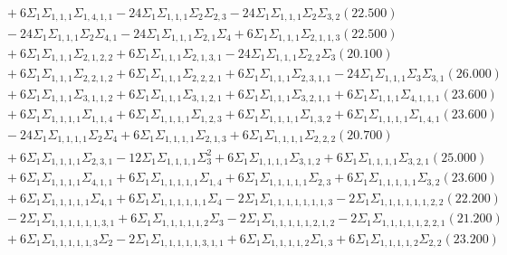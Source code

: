 \documentclass[12pt]{article}
\begin{document}
\begin{landscape}
\begin{align*}
		&\quad\quad +6\Sigma_{1}\Sigma_{1,1,1}\Sigma_{1,4,1,1}-24\Sigma_{1}\Sigma_{1,1,1}\Sigma_{2}\Sigma_{2,3}-24\Sigma_{1}\Sigma_{1,1,1}\Sigma_{2}\Sigma_{3,2}(22.500) \\ 
		&\quad\quad -24\Sigma_{1}\Sigma_{1,1,1}\Sigma_{2}\Sigma_{4,1}-24\Sigma_{1}\Sigma_{1,1,1}\Sigma_{2,1}\Sigma_{4}+6\Sigma_{1}\Sigma_{1,1,1}\Sigma_{2,1,1,3}(22.500) \\ 
		&\quad\quad +6\Sigma_{1}\Sigma_{1,1,1}\Sigma_{2,1,2,2}+6\Sigma_{1}\Sigma_{1,1,1}\Sigma_{2,1,3,1}-24\Sigma_{1}\Sigma_{1,1,1}\Sigma_{2,2}\Sigma_{3}(20.100) \\ 
		&\quad\quad +6\Sigma_{1}\Sigma_{1,1,1}\Sigma_{2,2,1,2}+6\Sigma_{1}\Sigma_{1,1,1}\Sigma_{2,2,2,1}+6\Sigma_{1}\Sigma_{1,1,1}\Sigma_{2,3,1,1}-24\Sigma_{1}\Sigma_{1,1,1}\Sigma_{3}\Sigma_{3,1}(26.000) \\ 
		&\quad\quad +6\Sigma_{1}\Sigma_{1,1,1}\Sigma_{3,1,1,2}+6\Sigma_{1}\Sigma_{1,1,1}\Sigma_{3,1,2,1}+6\Sigma_{1}\Sigma_{1,1,1}\Sigma_{3,2,1,1}+6\Sigma_{1}\Sigma_{1,1,1}\Sigma_{4,1,1,1}(23.600) \\ 
		&\quad\quad +6\Sigma_{1}\Sigma_{1,1,1,1}\Sigma_{1,1,4}+6\Sigma_{1}\Sigma_{1,1,1,1}\Sigma_{1,2,3}+6\Sigma_{1}\Sigma_{1,1,1,1}\Sigma_{1,3,2}+6\Sigma_{1}\Sigma_{1,1,1,1}\Sigma_{1,4,1}(23.600) \\ 
		&\quad\quad -24\Sigma_{1}\Sigma_{1,1,1,1}\Sigma_{2}\Sigma_{4}+6\Sigma_{1}\Sigma_{1,1,1,1}\Sigma_{2,1,3}+6\Sigma_{1}\Sigma_{1,1,1,1}\Sigma_{2,2,2}(20.700) \\ 
		&\quad\quad +6\Sigma_{1}\Sigma_{1,1,1,1}\Sigma_{2,3,1}-12\Sigma_{1}\Sigma_{1,1,1,1}\Sigma_{3}^{2}+6\Sigma_{1}\Sigma_{1,1,1,1}\Sigma_{3,1,2}+6\Sigma_{1}\Sigma_{1,1,1,1}\Sigma_{3,2,1}(25.000) \\ 
		&\quad\quad +6\Sigma_{1}\Sigma_{1,1,1,1}\Sigma_{4,1,1}+6\Sigma_{1}\Sigma_{1,1,1,1,1}\Sigma_{1,4}+6\Sigma_{1}\Sigma_{1,1,1,1,1}\Sigma_{2,3}+6\Sigma_{1}\Sigma_{1,1,1,1,1}\Sigma_{3,2}(23.600) \\ 
		&\quad\quad +6\Sigma_{1}\Sigma_{1,1,1,1,1}\Sigma_{4,1}+6\Sigma_{1}\Sigma_{1,1,1,1,1,1}\Sigma_{4}-2\Sigma_{1}\Sigma_{1,1,1,1,1,1,1,3}-2\Sigma_{1}\Sigma_{1,1,1,1,1,1,2,2}(22.200) \\ 
		&\quad\quad -2\Sigma_{1}\Sigma_{1,1,1,1,1,1,3,1}+6\Sigma_{1}\Sigma_{1,1,1,1,1,2}\Sigma_{3}-2\Sigma_{1}\Sigma_{1,1,1,1,1,2,1,2}-2\Sigma_{1}\Sigma_{1,1,1,1,1,2,2,1}(21.200) \\ 
		&\quad\quad +6\Sigma_{1}\Sigma_{1,1,1,1,1,3}\Sigma_{2}-2\Sigma_{1}\Sigma_{1,1,1,1,1,3,1,1}+6\Sigma_{1}\Sigma_{1,1,1,1,2}\Sigma_{1,3}+6\Sigma_{1}\Sigma_{1,1,1,1,2}\Sigma_{2,2}(23.200) \\ 

\end{align*}
\end{landscape}
\end{document}
